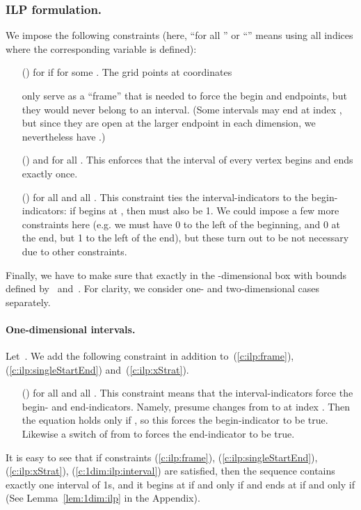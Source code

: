 \documentclass[runningheads]{llncs}
\newcounter{constr}
\newcommand{\constr}[1]{\noindent \refstepcounter{constr}\theconstr #1}
\begin{document}
\subsubsection{ILP formulation.}
\label{se:1dim:ilp}
We impose the following constraints (here, ``for all '' or ``'' 
means using all indices   where the corresponding variable is defined): 
\begin{itemize}
\item[(\constr{\label{c:ilp:frame}})] 
	 for 
	if  for some .
	The grid points at coordinates
	 
	only serve as a ``frame'' that is needed
	to force the begin and endpoints, but they would never belong
	to an interval.  (Some intervals may end at index , but
	since they are open at the larger endpoint in each dimension, we nevertheless
	have .)
\item[(\constr{\label{c:ilp:singleStartEnd}})] 
	 and 
	 for all .
	This enforces that the interval of every vertex 
	begins and ends exactly once.
\item[(\constr{\label{c:ilp:xStrat}})] 
	 for all  and all .
	This constraint ties the interval-indicators to the begin-indicators:
	if  begins at , then  must also be 1.  We could
	impose a few more constraints here (e.g. we must have 0 to the
	left of the beginning, and 0 at the end, but 1 to the left of
	the end), but these turn out to be not necessary due to other
	constraints.	
\end{itemize}
Finally, we have to make sure that 
exactly in the -dimensional box with bounds defined by~
and~. For clarity, we consider one- 
and two-dimensional cases separately.
\paragraph*{One-dimensional intervals.}
Let~. We add the following constraint
in addition to~(\ref{c:ilp:frame}), (\ref{c:ilp:singleStartEnd})
and~(\ref{c:ilp:xStrat}).
\begin{itemize}
  \item[(\constr{\label{c:1dim:ilp:interval}})] 
	 for all 
	and all .  This constraint means that the
	interval-indicators force the begin- and end-indicators.
	Namely, presume  changes from  to  at index .  
	Then the equation holds only if
	, so this forces the begin-indicator to be true.
	Likewise a switch of  from  to  forces the end-indicator
	to be true.
\end{itemize}
It is easy to see that if constraints
(\ref{c:ilp:frame}), (\ref{c:ilp:singleStartEnd}),
(\ref{c:ilp:xStrat}), (\ref{c:1dim:ilp:interval})
 are satisfied, then the sequence
 contains exactly one interval of 1s,
and it begins at  if and only if  and
ends at  if and only if  
(See Lemma~\ref{lem:1dim:ilp} in the Appendix).
\end{document}
